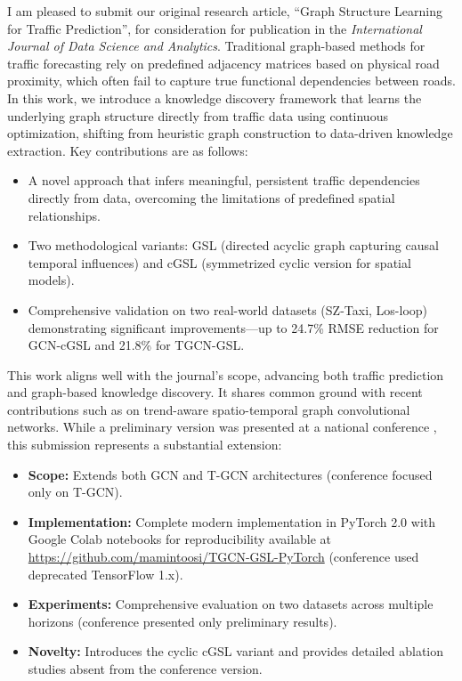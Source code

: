 \documentclass[10pt]{article}
\begin{document}
I am pleased to submit our original research article, ``Graph Structure Learning for Traffic Prediction'', for consideration for publication in the \textit{International Journal of Data Science and Analytics}.
Traditional graph-based methods for traffic forecasting rely on predefined adjacency matrices based on physical road proximity, which often fail to capture true functional dependencies between roads. In this work, we introduce a knowledge discovery framework that learns the underlying graph structure directly from traffic data using continuous optimization, shifting from heuristic graph construction to data-driven knowledge extraction. Key contributions are as follows:
\begin{itemize}
    \item A novel approach that infers meaningful, persistent traffic dependencies directly from data, overcoming the limitations of predefined spatial relationships.
    \item Two methodological variants: GSL (directed acyclic graph capturing causal temporal influences) and cGSL (symmetrized cyclic version for spatial models).
    \item Comprehensive validation on two real-world datasets (SZ-Taxi, Los-loop) demonstrating significant improvements—up to 24.7\% RMSE reduction for GCN-cGSL and 21.8\% for TGCN-GSL.
\end{itemize}

This work aligns well with the journal's scope, advancing both traffic prediction and graph-based knowledge discovery. It shares common ground with recent contributions such as \cite{Chen2026TASTGCN} on trend-aware spatio-temporal graph convolutional networks.
While a preliminary version was presented at a national conference \citep{Amintoosi1403aimc55-GSL}, this submission represents a substantial extension:
\begin{itemize}
    \item \textbf{Scope:} Extends both GCN and T-GCN architectures (conference focused only on T-GCN).
    \item \textbf{Implementation:} Complete modern implementation in PyTorch 2.0 with Google Colab notebooks for reproducibility  available at \url{https://github.com/mamintoosi/TGCN-GSL-PyTorch} (conference used deprecated TensorFlow 1.x).
    \item \textbf{Experiments:} Comprehensive evaluation on two datasets across multiple horizons (conference presented only preliminary results).
    \item \textbf{Novelty:} Introduces the cyclic cGSL variant and provides detailed ablation studies absent from the conference version.
\end{itemize}
\end{document}
